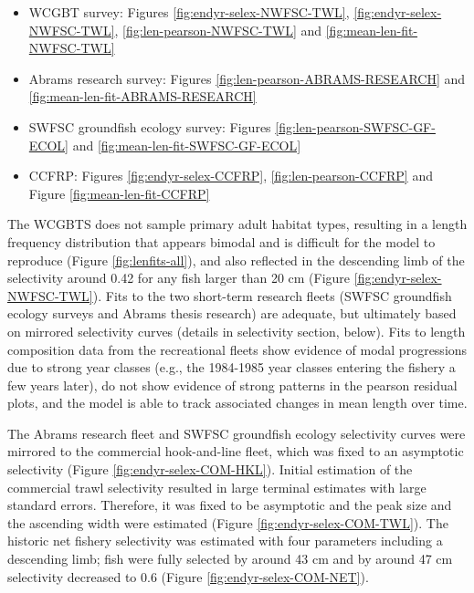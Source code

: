 \documentclass[11pt,
  english,
]{article}
\begin{document}
\begin{itemize}
  \tagmcend\tagstructend\tagstructend
\item

  WCGBT survey: Figures \ref{fig:endyr-selex-NWFSC-TWL}, \ref{fig:endyr-selex-NWFSC-TWL}, \ref{fig:len-pearson-NWFSC-TWL} and \ref{fig:mean-len-fit-NWFSC-TWL}

  \tagmcend\tagstructend\tagstructend
\item

  Abrams research survey: Figures \ref{fig:len-pearson-ABRAMS-RESEARCH} and \ref{fig:mean-len-fit-ABRAMS-RESEARCH}

  \tagmcend\tagstructend\tagstructend
\item

  SWFSC groundfish ecology survey: Figures \ref{fig:len-pearson-SWFSC-GF-ECOL} and \ref{fig:mean-len-fit-SWFSC-GF-ECOL}

  \tagmcend\tagstructend\tagstructend
\item

  CCFRP: Figures \ref{fig:endyr-selex-CCFRP}, \ref{fig:len-pearson-CCFRP} and Figure \ref{fig:mean-len-fit-CCFRP}

  \tagmcend\tagstructend\tagstructend
\end{itemize}

\tagstructend

The WCGBTS does not sample primary adult habitat types, resulting in a length frequency distribution that appears bimodal and is difficult for the model to reproduce (Figure \ref{fig:lenfits-all}), and also reflected in the descending limb of the selectivity around 0.42 for any fish larger than 20 cm (Figure \ref{fig:endyr-selex-NWFSC-TWL}). Fits to the two short-term research fleets (SWFSC groundfish ecology surveys and Abrams thesis research) are adequate, but ultimately based on mirrored selectivity curves (details in selectivity section, below). Fits to length composition data from the recreational fleets show evidence of modal progressions due to strong year classes (e.g., the 1984-1985 year classes entering the fishery a few years later), do not show evidence of strong patterns in the pearson residual plots, and the model is able to track associated changes in mean length over time.

The Abrams research fleet and SWFSC groundfish ecology selectivity curves were mirrored to the commercial hook-and-line fleet, which was fixed to an asymptotic selectivity (Figure \ref{fig:endyr-selex-COM-HKL}). Initial estimation of the commercial trawl selectivity resulted in large terminal estimates with large standard errors. Therefore, it was fixed to be asymptotic and the peak size and the ascending width were estimated (Figure \ref{fig:endyr-selex-COM-TWL}). The historic net fishery selectivity was estimated with four parameters including a descending limb; fish were fully selected by around 43 cm and by around 47 cm selectivity decreased to 0.6 (Figure \ref{fig:endyr-selex-COM-NET}).
\end{document}
